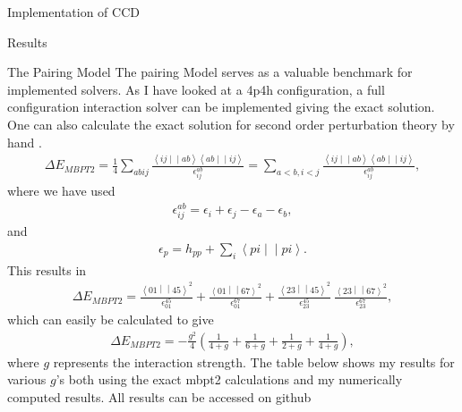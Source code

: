 \documentclass[twoside,english]{uiofysmaster}
\begin{document}
\begin{chapter}{Implementation of CCD}
\end{chapter}



\begin{chapter}{Results}
	
	\begin{section}{The Pairing Model}
		The pairing Model serves as a valuable benchmark for
                implemented solvers. As I have looked at a 4p4h
                configuration, a full configuration interaction solver
                can be implemented giving the exact solution. One can
                also calculate the exact solution for second order
                perturbation theory by hand \cite{Hjorth-Jensen2016}.
		\begin{align}
			\Delta E_{MBPT2} = \frac{1}{4} \sum_{abij} \frac{\left<ij\middle|\middle|ab\right>\left<ab\middle|\middle|ij\right>}{\epsilon_{ij}^{ab}} = 
			\sum_{a<b,i<j} \frac{\left<ij\middle|\middle|ab\right>\left<ab\middle|\middle|ij\right>}{\epsilon_{ij}^{ab}},
		\end{align}
		where we have used
		\begin{align}
			\epsilon_{ij}^{ab} = \epsilon_i + \epsilon_j - \epsilon_a - \epsilon_b,
		\end{align}
		and
		\begin{align}
			\epsilon_p = h_{pp} + \sum_i \left<pi\middle|\middle|pi\right>.
		\end{align}
		This results in
		\begin{align}
			\Delta E_{MBPT2} = \frac{\left<01\middle|\middle|45\right>^2}{\epsilon_{01}^{45} } + \frac{\left<01\middle|\middle|67\right>^2}{\epsilon_{01}^{67} }
							  +\frac{\left<23\middle|\middle|45\right>^2}{\epsilon_{23}^{45} } \ \frac{\left<23\middle|\middle|67\right>^2}{\epsilon_{23}^{67} },
		\end{align}
		which can easily be calculated to give
		\begin{align}
			\Delta E_{MBPT2} = -\frac{g^2}{4} \left( \frac{1}{4+g} + \frac{1}{6+g} + \frac{1}{2+g} + \frac{1}{4+g} \right),
		\end{align}
		where $g$ represents the interaction strength. The table below shows my results for various $g$'s both using the exact mbpt2 calculations and my numerically computed results. All results can be accessed on github \cite{WholmenGithub}


\end{section}
\end{chapter}
\end{document}
